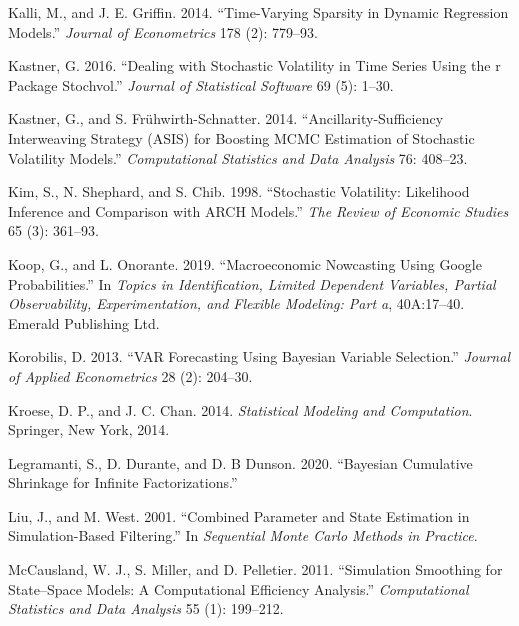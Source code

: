 \documentclass[
  12pt,
]{book}
\newlength{\cslhangindent}
\newlength{\cslentryspacingunit} %
\newenvironment{CSLReferences}[2] %
 {%
  \setlength{\parindent}{0pt}
  \ifodd #1
  \let\oldpar\par
  \def\par{\hangindent=\cslhangindent\oldpar}
  \fi
  \setlength{\parskip}{#2\cslentryspacingunit}
 }%
 {}
\theoremstyle{break}
\theoremstyle{nonumberplain}
\begin{document}
\begin{CSLReferences}{1}{0}
\leavevmode{}%
Kalli, M., and J. E. Griffin. 2014. {``Time-Varying Sparsity in Dynamic
Regression Models.''} \emph{Journal of Econometrics} 178 (2): 779--93.

\leavevmode{}%
Kastner, G. 2016. {``Dealing with Stochastic Volatility in Time Series
Using the r Package Stochvol.''} \emph{Journal of Statistical Software}
69 (5): 1--30.

\leavevmode{}%
Kastner, G., and S. Frühwirth-Schnatter. 2014.
{``Ancillarity-Sufficiency Interweaving Strategy (ASIS) for Boosting
MCMC Estimation of Stochastic Volatility Models.''} \emph{Computational
Statistics and Data Analysis} 76: 408--23.

\leavevmode{}%
Kim, S., N. Shephard, and S. Chib. 1998. {``Stochastic Volatility:
Likelihood Inference and Comparison with ARCH Models.''} \emph{The
Review of Economic Studies} 65 (3): 361--93.

\leavevmode{}%
Koop, G., and L. Onorante. 2019. {``Macroeconomic Nowcasting Using
Google Probabilities.''} In \emph{Topics in Identification, Limited
Dependent Variables, Partial Observability, Experimentation, and
Flexible Modeling: Part a}, 40A:17--40. Emerald Publishing Ltd.

\leavevmode{}%
Korobilis, D. 2013. {``VAR Forecasting Using Bayesian Variable
Selection.''} \emph{Journal of Applied Econometrics} 28 (2): 204--30.

\leavevmode{}%
Kroese, D. P., and J. C. Chan. 2014. \emph{Statistical Modeling and
Computation}. Springer, New York, 2014.

\leavevmode{}%
Legramanti, S., D. Durante, and D. B Dunson. 2020. {``Bayesian
Cumulative Shrinkage for Infinite Factorizations.''}

\leavevmode{}%
Liu, J., and M. West. 2001. {``Combined Parameter and State Estimation
in Simulation-Based Filtering.''} In \emph{Sequential Monte Carlo
Methods in Practice}.

\leavevmode{}%
McCausland, W. J., S. Miller, and D. Pelletier. 2011. {``Simulation
Smoothing for State--Space Models: A Computational Efficiency
Analysis.''} \emph{Computational Statistics and Data Analysis} 55 (1):
199--212.


\end{CSLReferences}
\end{document}
